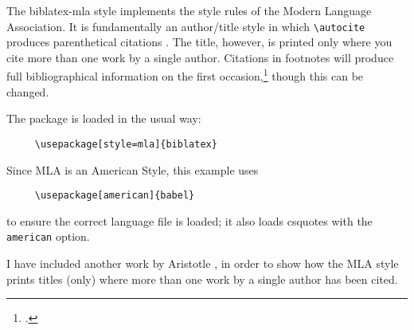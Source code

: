 
\usepackage[style=american]{csquotes}
\usepackage[american]{babel}
\usepackage[style=mla,backend=biber]{biblatex}

\renewcommand{\showingstyle}{MLA}
%
The \textsf{biblatex-mla} style implements the style rules of the Modern Language Association. It is fundamentally an author/title style in which \verb~\autocite~ produces parenthetical citations \autocite{worman}. The title, however, is printed only where you cite more than one work by a single author. Citations in footnotes will produce full bibliographical information on the first occasion,\footcite{aristotle:poetics} though this can be changed.

The package is loaded in the usual way:
\begin{verbatim}
     \usepackage[style=mla]{biblatex}
\end{verbatim}
Since MLA is an American Style, this example uses
\begin{verbatim}
     \usepackage[american]{babel}
\end{verbatim}
to ensure the correct language file is loaded; it also loads \textsf{csquotes} with the \verb~american~ option.

 I have included another work by Aristotle \parencite{aristotle:poetics}, in order to show how the MLA style prints titles (only) where more than one work by a single author has been cited.



